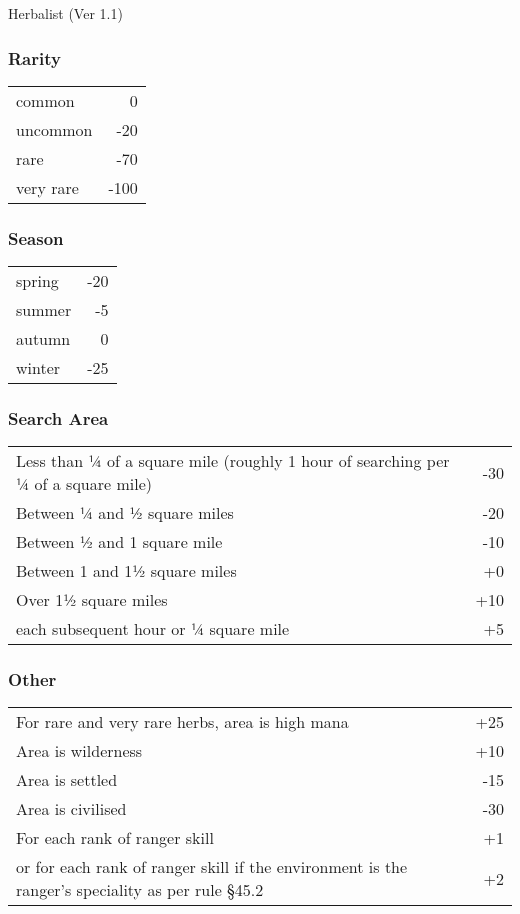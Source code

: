\begin{Chapter}{Herbalist (Ver 1.1)}
\subsubsection{Rarity}

\begin{tabularx}{\columnwidth}{Xr}
common		& 0 \\
uncommon	& -20 \\
rare		& -70 \\
very rare	& -100 \\
\end{tabularx}

\subsubsection{Season}

\begin{tabularx}{\columnwidth}{Xr}
spring		& -20 \\
summer		& -5 \\
autumn		& 0 \\
winter		& -25 \\
\end{tabularx}

\subsubsection{Search Area}

\begin{tabularx}{\columnwidth}{Xr}
Less than ¼ of a square mile (roughly 1 hour of searching per ¼ of a square mile) & -30 \\
Between ¼ and ½ square miles	& -20 \\
Between ½ and 1 square mile	& -10 \\
Between 1 and 1½ square miles	& +0 \\
Over 1½ square miles		& +10 \\
each subsequent hour or ¼ square mile	& +5 \\
\end{tabularx}

\subsubsection{Other}

\begin{tabularx}{\columnwidth}{Xr}
For rare and very rare herbs, area is high mana		& +25 \\
Area is wilderness					& +10 \\
Area is settled						& -15 \\
Area is civilised					& -30 \\
For each rank of ranger skill				& +1 \\
or for each rank of  ranger skill if the environment is the ranger’s speciality as per rule §45.2 & +2 \\
\end{tabularx}


\end{Chapter}

